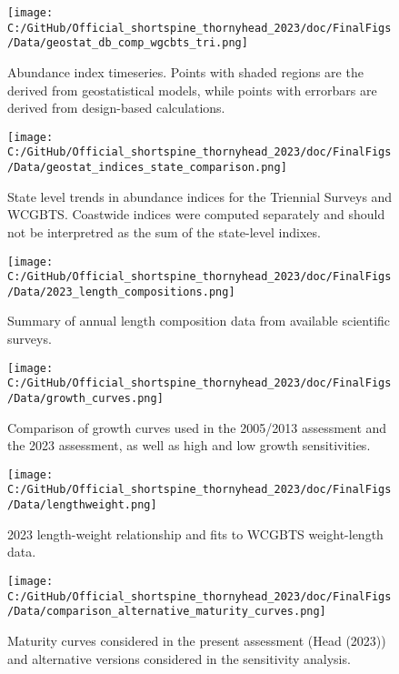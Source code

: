 \documentclass[11pt,
  english,
  letterpaper,
]{article}
\begin{document}
\begin{figure}
\centering
\texttt{[image: C:/GitHub/Official\_shortspine\_thornyhead\_2023/doc/FinalFigs/Data/geostat\_db\_comp\_wgcbts\_tri.png]}
\caption{Abundance index timeseries. Points with shaded regions are the derived from geostatistical models, while points with errorbars are derived from design-based calculations.\label{fig:modelbasedsurv}}
\end{figure}

\begin{figure}
\centering
\texttt{[image: C:/GitHub/Official\_shortspine\_thornyhead\_2023/doc/FinalFigs/Data/geostat\_indices\_state\_comparison.png]}
\caption{State level trends in abundance indices for the Triennial Surveys and WCGBTS. Coastwide indices were computed separately and should not be interpretred as the sum of the state-level indixes.\label{fig:state_indices}}
\end{figure}

\begin{figure}
\centering
\texttt{[image: C:/GitHub/Official\_shortspine\_thornyhead\_2023/doc/FinalFigs/Data/2023\_length\_compositions.png]}
\caption{Summary of annual length composition data from available scientific surveys.\label{fig:survey_comps}}
\end{figure}

\begin{figure}
\centering
\texttt{[image: C:/GitHub/Official\_shortspine\_thornyhead\_2023/doc/FinalFigs/Data/growth\_curves.png]}
\caption{Comparison of growth curves used in the 2005/2013 assessment and the 2023 assessment, as well as high and low growth sensitivities.\label{fig:growthcurve}}
\end{figure}

\begin{figure}
\centering
\texttt{[image: C:/GitHub/Official\_shortspine\_thornyhead\_2023/doc/FinalFigs/Data/lengthweight.png]}
\caption{2023 length-weight relationship and fits to WCGBTS weight-length data.\label{fig:lengthweight}}
\end{figure}

\begin{figure}
\centering
\texttt{[image: C:/GitHub/Official\_shortspine\_thornyhead\_2023/doc/FinalFigs/Data/comparison\_alternative\_maturity\_curves.png]}
\caption{Maturity curves considered in the present assessment (Head (2023)) and alternative versions considered in the sensitivity analysis.\label{fig:mat2}}
\end{figure}
\end{document}
